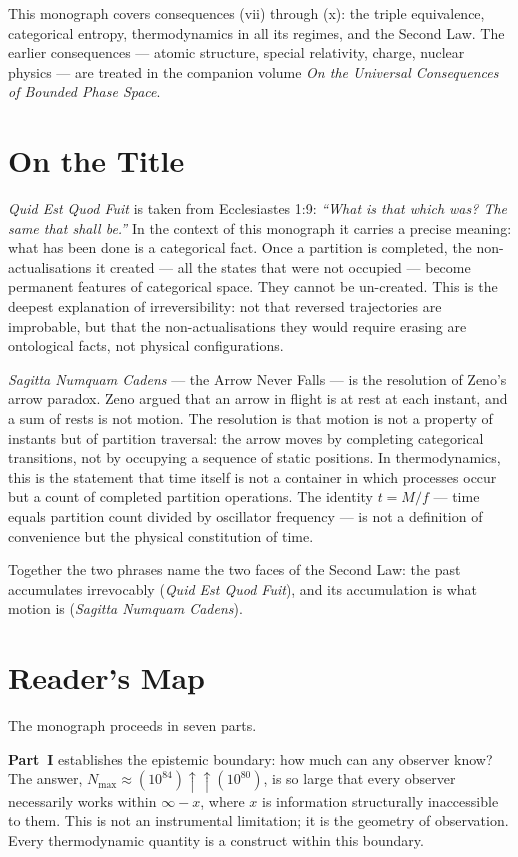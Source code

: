 This monograph covers consequences (vii) through (x): the triple equivalence, categorical entropy, thermodynamics in all its regimes, and the Second Law. The earlier consequences — atomic structure, special relativity, charge, nuclear physics — are treated in the companion volume \emph{On the Universal Consequences of Bounded Phase Space}.

\section*{On the Title}

\emph{Quid Est Quod Fuit} is taken from Ecclesiastes 1:9: \emph{``What is that which was? The same that shall be.''} In the context of this monograph it carries a precise meaning: what has been done is a categorical fact. Once a partition is completed, the non-actualisations it created — all the states that were not occupied — become permanent features of categorical space. They cannot be un-created. This is the deepest explanation of irreversibility: not that reversed trajectories are improbable, but that the non-actualisations they would require erasing are ontological facts, not physical configurations.

\emph{Sagitta Numquam Cadens} — the Arrow Never Falls — is the resolution of Zeno's arrow paradox. Zeno argued that an arrow in flight is at rest at each instant, and a sum of rests is not motion. The resolution is that motion is not a property of instants but of partition traversal: the arrow moves by completing categorical transitions, not by occupying a sequence of static positions. In thermodynamics, this is the statement that time itself is not a container in which processes occur but a count of completed partition operations. The identity $t = M/f$ — time equals partition count divided by oscillator frequency — is not a definition of convenience but the physical constitution of time.

Together the two phrases name the two faces of the Second Law: the past accumulates irrevocably (\emph{Quid Est Quod Fuit}), and its accumulation is what motion is (\emph{Sagitta Numquam Cadens}).

\section*{Reader's Map}

The monograph proceeds in seven parts.

\textbf{Part~I} establishes the epistemic boundary: how much can any observer know? The answer, $N_{\max} \approx (10^{84})\uparrow\uparrow(10^{80})$, is so large that every observer necessarily works within $\infty - x$, where $x$ is information structurally inaccessible to them. This is not an instrumental limitation; it is the geometry of observation. Every thermodynamic quantity is a construct within this boundary.

